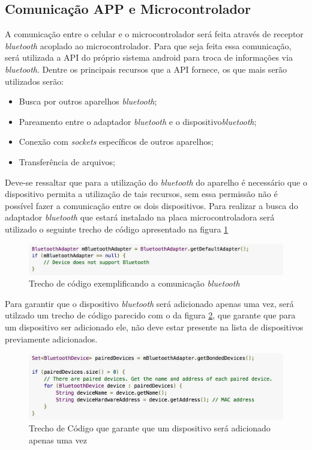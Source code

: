 	\subsection{Comunicação APP e Microcontrolador}
	  A comunicação entre o celular e o microcontrolador será feita através de receptor \textit{bluetooth} acoplado ao microcontrolador. Para que seja feita essa comunicação, será utilizada a API do próprio sistema android para troca de informações via \textit{bluetooth}. Dentre os principais recursos que a API fornece, os que mais serão utilizados serão:
	  \begin{itemize}
	  	\item Busca por outros aparelhos \textit{bluetooth};
	  	\item Pareamento entre o adaptador \textit{bluetooth} e o dispositivo\textit{bluetooth};
	  	\item Conexão com \textit{sockets} específicos de outros aparelhos;
	  	\item Transferência de arquivos;
	  \end{itemize}
	  
	  Deve-se ressaltar que para a utilização do \textit{bluetooth} do aparelho é necessário que o dispositivo permita a utilização de tais recursos, sem essa permissão não é possível fazer a comunicação entre os dois dispositivos.  
  	Para realizar a busca do adaptador \textit{bluetooth} que estará instalado na placa microcontroladora será utilizado o seguinte trecho de código apresentado na figura \ref{img:bluetooth_enabled}
  	
  	\graphicspath{{figuras/}}
  	\begin{figure}[h!]
  	\centering
  	\includegraphics[scale=0.60]{bluetooth_enabled}
  	\caption{Trecho de código exemplificando a comunicação \textit{bluetooth}}
  	\label{img:bluetooth_enabled}
  	\end{figure}
  	
  	Para garantir que o dispositivo \textit{bluetooth} será adicionado apenas uma vez, será utilzado um trecho de código parecido com o da figura \ref{img:bluetooth_devices}, que garante que para um dispositivo ser adicionado ele, não deve estar presente na lista de dispositivos previamente adicionados.
  	
  	\graphicspath{{figuras/}}
  	\begin{figure}[h!]
  	\centering
  	\includegraphics[scale=0.60]{bluetooth_paired_devices}
  	\caption{Trecho de Código que garante que um dispositivo será adicionado apenas uma vez}
  	\label{img:bluetooth_devices}
  	\end{figure}
  	
